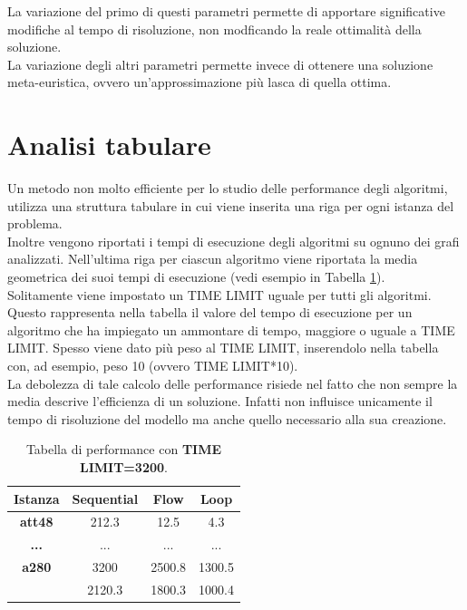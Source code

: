 La variazione del primo di questi parametri permette di apportare significative modifiche al tempo di risoluzione, non modficando la reale ottimalità della soluzione.\\
La variazione degli altri parametri permette invece di ottenere una soluzione meta-euristica, ovvero un'approssimazione più lasca di quella ottima.
 
\section{Analisi tabulare}
Un metodo non molto efficiente per lo studio delle performance degli algoritmi, utilizza una struttura tabulare in cui viene inserita una riga per ogni istanza del problema.\\ Inoltre vengono riportati i tempi di esecuzione degli algoritmi su ognuno dei grafi analizzati. Nell'ultima riga per ciascun algoritmo viene riportata la media geometrica dei suoi tempi di esecuzione (vedi esempio in Tabella \ref{result_table}).\\
Solitamente viene impostato un TIME LIMIT uguale per tutti gli algoritmi. Questo rappresenta nella tabella il valore del tempo di esecuzione per un algoritmo che ha impiegato un ammontare di tempo, maggiore o uguale a TIME LIMIT. Spesso viene dato più peso al TIME LIMIT, inserendolo nella tabella con, ad esempio, peso 10 (ovvero TIME LIMIT*10).\\ La debolezza di tale calcolo delle performance risiede nel fatto che non sempre la media descrive  l'efficienza di un soluzione. Infatti non influisce unicamente il tempo di risoluzione del modello ma anche quello necessario alla sua creazione. 

\begin{table}[h]
\centering
\begin{tabular}{|c|c|c|c|}
\multicolumn{1}{c}{\textbf{Istanza}} & \multicolumn{1}{c}{\textbf{Sequential}} & \multicolumn{1}{c}{\textbf{Flow}} &
\multicolumn{1}{c}{\textbf{Loop}}\\
\hline
\textbf{att48} & {212.3} & {12.5} & {4.3}\\
\hline
{\textbf{...}} & {...} & {...} & {...}\\
\hline
\textbf{a280} & {3200} & {2500.8} & {1300.5}\\
\hline
\hline
\multicolumn{1}{c}{} & \multicolumn{1}{c}{2120.3} & \multicolumn{1}{c}{1800.3}& \multicolumn{1}{c}{1000.4}\\
\end{tabular}
\caption{\footnotesize{Tabella di performance con \textbf{TIME LIMIT=3200}.}}\label{result_table}
\end{table}


